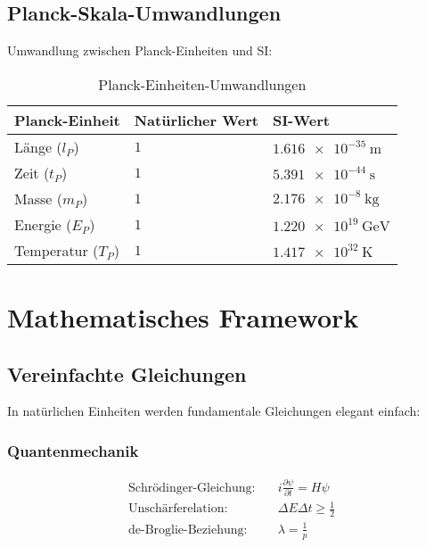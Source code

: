 \documentclass[11pt,a4paper]{article}
\begin{document}
	\subsection{Planck-Skala-Umwandlungen}
	
	Umwandlung zwischen Planck-Einheiten und SI:
	
	\begin{table}[htbp]
		\centering
		\begin{adjustbox}{width=0.8\textwidth}
			\begin{tabular}{lll}
				\toprule
				\textbf{Planck-Einheit} & \textbf{Natürlicher Wert} & \textbf{SI-Wert} \\
				\midrule
				Länge ($l_P$) & $1$ & $\SI{1.616e-35}{\meter}$ \\
				Zeit ($t_P$) & $1$ & $\SI{5.391e-44}{\second}$ \\
				Masse ($m_P$) & $1$ & $\SI{2.176e-8}{\kilogram}$ \\
				Energie ($E_P$) & $1$ & $\SI{1.220e19}{\giga\electronvolt}$ \\
				Temperatur ($T_P$) & $1$ & $\SI{1.417e32}{\kelvin}$ \\
				\bottomrule
			\end{tabular}
		\end{adjustbox}
		\caption{Planck-Einheiten-Umwandlungen}
		\label{tab:planck_umwandlungen}
	\end{table}
	
	\section{Mathematisches Framework}
	
	\subsection{Vereinfachte Gleichungen}
	
	In natürlichen Einheiten werden fundamentale Gleichungen elegant einfach:
	
	\subsubsection{Quantenmechanik}
	\begin{align}
		\text{Schrödinger-Gleichung:} \quad & i\frac{\partial\psi}{\partial t} = H\psi \\
		\text{Unschärferelation:} \quad & \Delta E \Delta t \geq \frac{1}{2} \\
		\text{de-Broglie-Beziehung:} \quad & \lambda = \frac{1}{p}
	\end{align}
	
\end{document}
